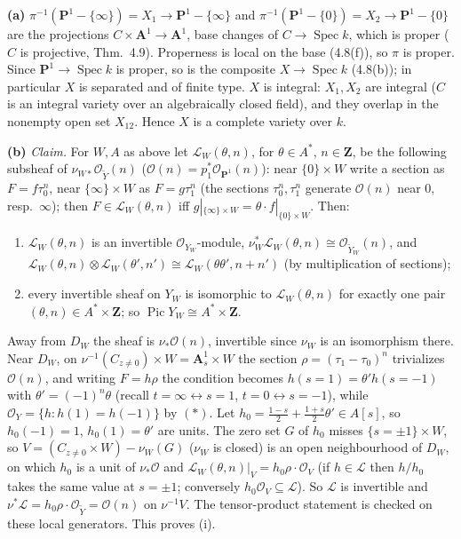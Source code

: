 \documentclass[11pt]{article}
\begin{document}
\textbf{(a)} $\pi^{-1}(\mathbf P^1-\{\infty\})=X_1\to\mathbf P^1-\{\infty\}$ and $\pi^{-1}(\mathbf P^1-\{0\})=X_2\to\mathbf P^1-\{0\}$ are the projections $C\times\mathbf A^1\to\mathbf A^1$, base changes of $C\to\operatorname{Spec}k$, which is proper ($C$ is projective, Thm.~4.9). Properness is local on the base (4.8(f)), so $\pi$ is proper. Since $\mathbf P^1\to\operatorname{Spec}k$ is proper, so is the composite $X\to\operatorname{Spec}k$ (4.8(b)); in particular $X$ is separated and of finite type. $X$ is integral: $X_1,X_2$ are integral ($C$ is an integral variety over an algebraically closed field), and they overlap in the nonempty open set $X_{12}$. Hence $X$ is a complete variety over $k$.

\textbf{(b)} \emph{Claim.} For $W,A$ as above let $\mathcal L_W(\theta,n)$, for $\theta\in A^*$, $n\in\mathbf Z$, be the following subsheaf of $\nu_{W*}\mathcal O_{\tilde Y}(n)$ ($\mathcal O(n)=p_1^*\mathcal O_{\mathbf P^1}(n)$): near $\{0\}\times W$ write a section as $F=f\tau_0^n$, near $\{\infty\}\times W$ as $F=g\tau_1^n$ (the sections $\tau_0^n,\tau_1^n$ generate $\mathcal O(n)$ near $0$, resp.\ $\infty$); then $F\in\mathcal L_W(\theta,n)$ iff $g|_{\{\infty\}\times W}=\theta\cdot f|_{\{0\}\times W}$. Then:
\begin{enumerate}
\item[(i)] $\mathcal L_W(\theta,n)$ is an invertible $\mathcal O_{Y_W}$-module, $\nu_W^*\mathcal L_W(\theta,n)\cong\mathcal O_{\tilde Y_W}(n)$, and $\mathcal L_W(\theta,n)\otimes\mathcal L_W(\theta',n')\cong\mathcal L_W(\theta\theta',n+n')$ (by multiplication of sections);
\item[(ii)] every invertible sheaf on $Y_W$ is isomorphic to $\mathcal L_W(\theta,n)$ for exactly one pair $(\theta,n)\in A^*\times\mathbf Z$; so $\operatorname{Pic}Y_W\cong A^*\times\mathbf Z$.
\end{enumerate}
Away from $D_W$ the sheaf is $\nu_*\mathcal O(n)$, invertible since $\nu_W$ is an isomorphism there. Near $D_W$, on $\nu^{-1}(C_{z\ne0})\times W=\mathbf A^1_s\times W$ the section $\rho=(\tau_1-\tau_0)^n$ trivializes $\mathcal O(n)$, and writing $F=h\rho$ the condition becomes $h(s{=}1)=\theta'h(s{=}-1)$ with $\theta'=(-1)^n\theta$ (recall $t=\infty\leftrightarrow s=1$, $t=0\leftrightarrow s=-1$), while $\mathcal O_Y=\{h:h(1)=h(-1)\}$ by $(*)$. Let $h_0=\frac{1-s}2+\frac{1+s}2\theta'\in A[s]$, so $h_0(-1)=1$, $h_0(1)=\theta'$ are units. The zero set $G$ of $h_0$ misses $\{s=\pm1\}\times W$, so $V=(C_{z\ne0}\times W)-\nu_W(G)$ ($\nu_W$ is closed) is an open neighbourhood of $D_W$, on which $h_0$ is a unit of $\nu_*\mathcal O$ and $\mathcal L_W(\theta,n)|_V=h_0\rho\cdot\mathcal O_V$ (if $h\in\mathcal L$ then $h/h_0$ takes the same value at $s=\pm1$; conversely $h_0\mathcal O_V\subseteq\mathcal L$). So $\mathcal L$ is invertible and $\nu^*\mathcal L=h_0\rho\cdot\mathcal O_{\tilde Y}=\mathcal O(n)$ on $\nu^{-1}V$. The tensor-product statement is checked on these local generators. This proves (i).
\end{document}
